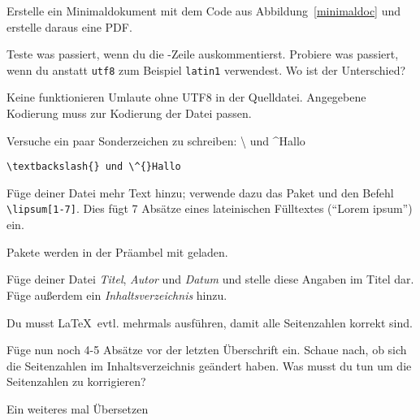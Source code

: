 \begin{uebung}
\item Erstelle ein Minimaldokument mit dem Code aus 
	Abbildung~\ref{minimaldoc} und erstelle daraus eine PDF.\label{firststart:first}


	
\item Teste was passiert, wenn du die -Zeile auskommentierst.
    Probiere was passiert, wenn du anstatt \texttt{utf8} zum Beispiel
    \texttt{latin1} verwendest. Wo ist der Unterschied?\label{inputenc}
    \begin{loesung}
        Keine funktionieren Umlaute ohne UTF8 in der Quelldatei. Angegebene Kodierung muss zur Kodierung der Datei passen.
    \end{loesung}
    
\item Versuche ein paar Sonderzeichen zu schreiben: \textbackslash{} und
    \^{}Hallo\label{specialchars}
    \begin{loesung}
        \verb|\textbackslash{} und \^{}Hallo|
    \end{loesung}

\item Füge deiner Datei mehr Text hinzu; verwende dazu das Paket 
	 und den Befehl \verb+\lipsum[1-7]+. Dies fügt
	7 Absätze eines lateinischen Fülltextes (\enquote{Lorem ipsum}) ein.
	\begin{hinweis}
	    Pakete werden in der Präambel mit  geladen.
	\end{hinweis}\label{firststart:last}

\item Füge deiner Datei \emph{Titel}, \emph{Autor} und 
	\emph{Datum} und stelle diese Angaben im Titel dar.
	Füge außerdem ein \emph{Inhaltsverzeichnis} hinzu.
	\begin{hinweis}
	    Du musst \LaTeX\ evtl. mehrmals ausführen, damit alle 
		Seitenzahlen korrekt sind.
	\end{hinweis}\label{markup:first}

\item Füge nun noch 4-5 Absätze vor der letzten Überschrift ein.
    Schaue nach, ob sich die Seitenzahlen im Inhaltsverzeichnis geändert haben.
    Was musst du tun um die Seitenzahlen zu korrigieren?
    \begin{loesung}
        Ein weiteres mal Übersetzen
    \end{loesung}


\end{uebung}
